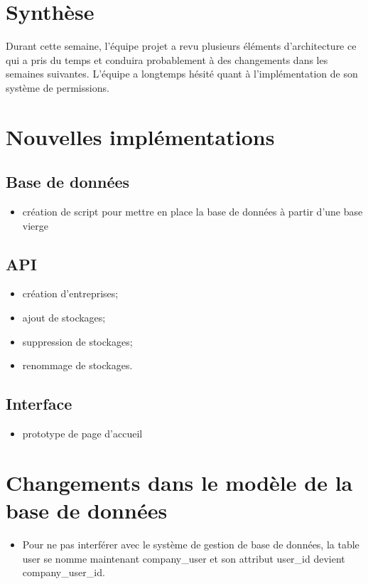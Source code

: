 \documentclass[a4paper, 12pt]{report}
\begin{document}
	\tableofcontents


	\newpage

	\chapter*{Synthèse}
		Durant cette semaine, l’équipe projet a revu plusieurs éléments d’architecture ce qui a pris du temps et conduira probablement à des changements dans les semaines suivantes.
		L’équipe a longtemps hésité quant à l’implémentation de son système de permissions.


	 \chapter{Nouvelles implémentations}
		\section{Base de données}
			\begin{itemize}
				\item création de script pour mettre en place la base de données à partir d’une base vierge
			\end{itemize}

		\section{API}
			\begin{itemize}
				\item création d’entreprises;
				\item ajout de stockages;
				\item suppression de stockages;
				\item renommage de stockages.
			\end{itemize}

		\section{Interface}
			\begin{itemize}
				\item prototype de page d’accueil
			\end{itemize}

	\chapter{Changements dans le modèle de la base de données}
		\begin{itemize}
			\item Pour ne pas interférer avec le système de gestion de base de données, la table user se nomme maintenant company\_user et son attribut user\_id devient company\_user\_id.
		\end{itemize}
			
\end{document}
